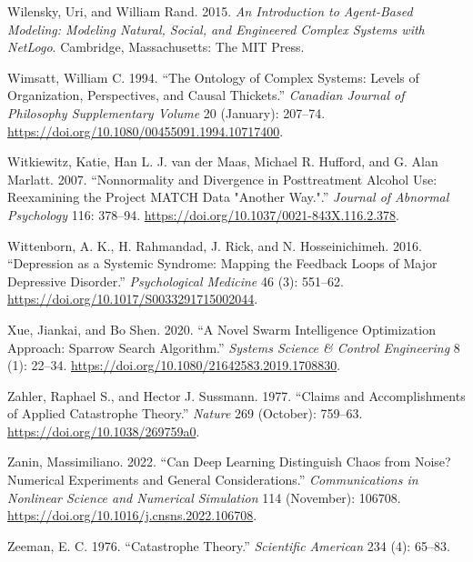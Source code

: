 \documentclass[
  a4paper,
  DIV=11,
  numbers=noendperiod,
  oneside]{scrreprt}
\newlength{\cslhangindent}
\newenvironment{CSLReferences}[2] %
 {\begin{list}{}{%
  \setlength{\itemindent}{0pt}
  \setlength{\leftmargin}{0pt}
  \setlength{\parsep}{0pt}
  \ifodd #1
   \setlength{\leftmargin}{\cslhangindent}
   \setlength{\itemindent}{-1\cslhangindent}
  \fi
  \setlength{\itemsep}{#2\baselineskip}}}
 {\end{list}}
\begin{document}
\begin{CSLReferences}{1}{0}
Wilensky, Uri, and William Rand. 2015. \emph{An Introduction to
Agent-Based Modeling: Modeling Natural, Social, and Engineered Complex
Systems with {NetLogo}}. {Cambridge, Massachusetts}: {The MIT Press}.

Wimsatt, William C. 1994. {``The Ontology of Complex Systems: Levels of
Organization, Perspectives, and Causal Thickets.''} \emph{Canadian
Journal of Philosophy Supplementary Volume} 20 (January): 207--74.
\url{https://doi.org/10.1080/00455091.1994.10717400}.

Witkiewitz, Katie, Han L. J. van der Maas, Michael R. Hufford, and G.
Alan Marlatt. 2007. {``Nonnormality and Divergence in Posttreatment
Alcohol Use: {Reexamining} the {Project MATCH} Data "Another Way.".''}
\emph{Journal of Abnormal Psychology} 116: 378--94.
\url{https://doi.org/10.1037/0021-843X.116.2.378}.

Wittenborn, A. K., H. Rahmandad, J. Rick, and N. Hosseinichimeh. 2016.
{``Depression as a Systemic Syndrome: Mapping the Feedback Loops of
Major Depressive Disorder.''} \emph{Psychological Medicine} 46 (3):
551--62. \url{https://doi.org/10.1017/S0033291715002044}.

Xue, Jiankai, and Bo Shen. 2020. {``A Novel Swarm Intelligence
Optimization Approach: Sparrow Search Algorithm.''} \emph{Systems
Science \& Control Engineering} 8 (1): 22--34.
\url{https://doi.org/10.1080/21642583.2019.1708830}.

Zahler, Raphael S., and Hector J. Sussmann. 1977. {``Claims and
Accomplishments of Applied Catastrophe Theory.''} \emph{Nature} 269
(October): 759--63. \url{https://doi.org/10.1038/269759a0}.

Zanin, Massimiliano. 2022. {``Can Deep Learning Distinguish Chaos from
Noise? Numerical Experiments and General Considerations.''}
\emph{Communications in Nonlinear Science and Numerical Simulation} 114
(November): 106708. \url{https://doi.org/10.1016/j.cnsns.2022.106708}.

Zeeman, E. C. 1976. {``Catastrophe {Theory}.''} \emph{Scientific
American} 234 (4): 65--83.


\end{CSLReferences}
\end{document}
